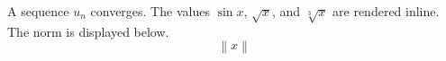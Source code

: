 A sequence $u_{n}$ converges. The values $\sin x$, $\sqrt{x}$, and $\sqrt[3]{x}$ are rendered inline. The norm is displayed below. \[\left\lVert x\right\rVert\]